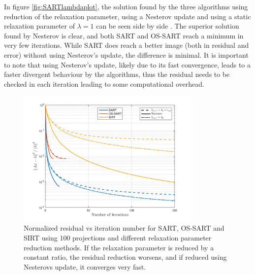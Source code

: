 In figure \ref{fig:SARTlambdaplot}, the solution found by the three algorithms using reduction of the relaxation parameter, using a Nesterov update and using a static relaxation parameter of $\lambda=1$ can be seen side by side . The superior solution found by Nesterov is clear, and both SART and OS-SART reach a minimum in very few iterations. While SART does reach a better image (both in residual and error) without using Nesterov's update, the difference is minimal. It is important to note that using Nesterov's update, likely due to its fast convergence, leads to a faster divergent behaviour by the algorithms, thus the residual needs to be checked in each iteration leading to some computational overhead.

\begin{figure}[H]
\begin{center}

\includegraphics[width=0.8\textwidth]{Applications/SARTlambda.png} 
\end{center}

\caption[Nomralized residual vs iteration of SART/OS-SART/SIRT with different relacation parameters]{\label{fig:SARTlambda} Normalized residual vs iteration number for SART, OS-SART and SIRT using 100 projections and different relaxation parameter reduction methods. If the relaxation parameter is reduced by a constant ratio, the residual reduction worsens, and if reduced using Nesterovs update, it converges very fast.} 
\end{figure}


